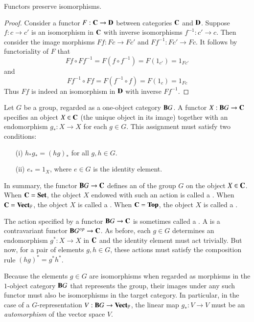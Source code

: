 \begin{lemma}
    Functors preserve isomorphisms.
\end{lemma}
\begin{proof}
    Consider a functor $F:\normalfont\textbf{C}\rightarrow \normalfont\textbf{D}$ between categories $\normalfont\textbf{C}$ and $\normalfont\textbf{D}$. Suppose $f:c\rightarrow c'$ is an isomorphism in $\normalfont\textbf{C}$ with inverse isomorphisms $f^{-1}:c'\rightarrow c$. Then consider the image morphisms $Ff:Fc\rightarrow Fc'$ and $Ff^{-1}:Fc'\rightarrow Fc$. It follows by functoriality of $F$ that \begin{equation*}
        Ff\circ Ff^{-1} = F(f\circ f^{-1}) = F(1_{c'}) = 1_{Fc'}
    \end{equation*}
    and \begin{equation*}
        Ff^{-1}\circ Ff = F(f^{-1}\circ f) = F(1_c) = 1_{Fc}
    \end{equation*}
    Thus $Ff$ is indeed an isomorphism in $\normalfont\textbf{D}$ with inverse $Ff^{-1}$.
\end{proof}


\begin{example}
    Let $G$ be a group, regarded as a one-object category $\normalfont\textbf{B}G$. A functor $X:\normalfont\textbf{B}G\rightarrow \normalfont\textbf{C}$ specifies an object $X \in \normalfont\textbf{C}$ (the unique object in its image) together with an endomorphism $g_*:X\rightarrow X$ for each $g \in G$. This assignment must satisfy two conditions: \begin{enumerate}
        \item[(i)] $h_*g_* = (hg)_*$ for all $g,h \in G$.
        \item[(ii)] $e_* = 1_X$, where $e \in G$ is the identity element.
    \end{enumerate}
    In summary, the functor $\normalfont\textbf{B}G\rightarrow \normalfont\textbf{C}$ defines an  of the group $G$ on the object $X \in \normalfont\textbf{C}$. When $\normalfont\textbf{C} = \normalfont\textbf{Set}$, the object $X$ endowed with such an action is called a . When $\normalfont\textbf{C} = \normalfont\textbf{Vect}_{\mathbb{F}}$, the object $X$ is called a . When $\normalfont\textbf{C} = \normalfont\textbf{Top}$, the object $X$ is called a . 

    The action specified by a functor $\normalfont\textbf{B}G\rightarrow \normalfont\textbf{C}$ is sometimes called a . A  is a contravariant functor $\normalfont\textbf{B}G^{op}\rightarrow \normalfont\textbf{C}$. As before, each $g \in G$ determines an endomorphism $g^*:X\rightarrow X$ in $\normalfont\textbf{C}$ and the identity element must act trivially. But now, for a pair of elements $g,h \in G$, these actions must satisfy the composition rule $(hg)^* = g^*h^*$. 


    Because the elements $g \in G$ are isomorphisms when regarded as morphisms in the $1$-object category $\normalfont\textbf{B}G$ that represents the group, their images under any such functor must also be isomorphisms in the target category. In particular, in the case of a $G$-representation $V:\normalfont\textbf{B}G\rightarrow \normalfont\textbf{Vect}_{\mathbb{F}}$, the linear map $g_*:V\rightarrow V$ must be an \emph{automorphism} of the vector space $V$. 
\end{example}

